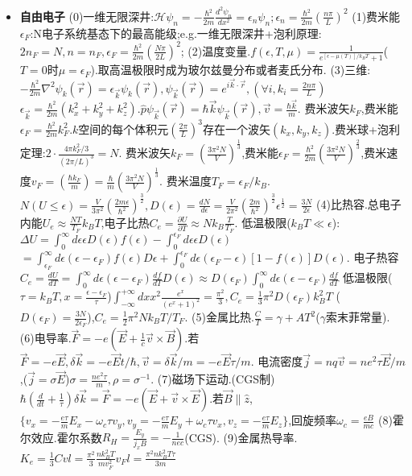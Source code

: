 \documentclass[UTF8,a4paper,3pt,twocolumn]{ctexart}
\begin{document}
\begin{itemize}
  \item \textbf{自由电子}
  (0)一维无限深井:$\mathcal{H}\psi_{n}=-\frac{\hbar^2}{2m}\frac{d^2\psi_{n}}{dx^2}=\epsilon_{n}\psi_{n};\epsilon_{n}=\frac{\hbar^2}{2m}(\frac{n\pi}{L})^2$
  (1)费米能$\epsilon_{F}$:N电子系统基态下的最高能级;e.g.一维无限深井+泡利原理:$2n_F=N,n=n_F,\epsilon_F=\frac{\hbar^2}{2m}(\frac{N\pi}{2L})^2$;
  (2)温度变量.$f(\epsilon,T,\mu)=\frac{1}{e^{[\epsilon-\mu(T)]/k_{B}T}+1}$($T=0$时$\mu=\epsilon_F$).取高温极限时成为玻尔兹曼分布或者麦氏分布.
  (3)三维:$-\frac{\hbar^2}{2m}\nabla^2\psi_{k}(\vec{r})=\epsilon_{\vec{k}}\psi_{k}(\vec{r}),\psi_{\vec{k}}(\vec{r})=e^{i\vec{k}\cdot\vec{r}},(\forall i,k_i=\frac{2n\pi}{L})$
  $\epsilon_{\vec{k}}=\frac{\hbar^2}{2m}(k_x^2+k_y^2+k_z^2)$.$\hat{p}\psi_{\vec{k}}(\vec{r})=\hbar\vec{k}\psi_{\vec{k}}(\vec{r}),\vec{v}=\frac{\hbar\vec{k}}{m}$.
  费米波矢$k_F$,费米能$\epsilon_F=\frac{\hbar^2}{2m}k_{F}^2$.$k$空间的每个体积元$(\frac{2\pi}{L})^3$存在一个波矢$(k_x,k_y,k_z)$.费米球+泡利定理:$2\cdot\frac{4\pi k_F^2/3}{(2\pi/L)^3}=N$.
  费米波矢$k_F=(\frac{3\pi^2N}{V})^{\frac{1}{3}}$,费米能$\epsilon_{F}=\frac{\hbar^2}{2m}(\frac{3\pi^2N}{V})^{\frac{2}{3}}$,费米速度$v_F=(\frac{\hbar k_F}{m})=\frac{\hbar}{m}(\frac{3\pi^2N}{V})^{\frac{1}{3}}$.
  费米温度$T_F=\epsilon_F/k_B$.$N(U\leq\epsilon)=\frac{V}{3\pi^2}(\frac{2m\epsilon}{\hbar^2})^{\frac{3}{2}},D(\epsilon)=\frac{dN}{d\epsilon}=\frac{V}{2\pi^2}(\frac{2m}{\hbar^2})^{\frac{3}{2}}\epsilon^{\frac{1}{2}}=\frac{3N}{2\epsilon}$
  (4)比热容.总电子内能$U_{e}\approx\frac{NT}{T_F}k_B T$,电子比热$C_{e}=\frac{\partial U}{\partial T}\approx Nk_B \frac{T}{T_F}$.
  低温极限($k_B T\ll \epsilon$):$\Delta U=\int_0^{\infty}d\epsilon\epsilon D(\epsilon)f(\epsilon)-\int_0^{\epsilon_F}d\epsilon\epsilon D(\epsilon)$
  $=\int_{\epsilon_F}^{\infty}d\epsilon(\epsilon-\epsilon_F)f(\epsilon)D\epsilon + \int_0^{\epsilon_F}d\epsilon(\epsilon_F-\epsilon)[1-f(\epsilon)]D(\epsilon)$.
  电子热容$C_e=\frac{dU}{dT}=\int_{0}^{\infty}d\epsilon(\epsilon-\epsilon_F)\frac{df}{dT}D(\epsilon)\approx D(\epsilon_F)\int_0^{\infty}d\epsilon(\epsilon-\epsilon_F)\frac{df}{dT}$
  低温极限($\tau=k_B T,x=\frac{\epsilon-\epsilon_F}{\tau}$)$\int_{-\infty}^{+\infty}dxx^2\frac{e^x}{(e^x +1)^2}=\frac{\pi^2}{3},C_e=\frac{1}{3}\pi^2D(\epsilon_F)k_B^2T$
  ($D(\epsilon_F)=\frac{3N}{2\epsilon_F}$),$C_e=\frac{1}{2}\pi^2Nk_BT/T_F$.
  (5)金属比热.$\frac{C}{T}=\gamma+AT^2$($\gamma$索末菲常量).
  (6)电导率.$\vec{F}=-e(\vec{E}+\frac{1}{c}\vec{v}\times\vec{B})$.若$\vec{F}=-e\vec{E},\delta\vec{k}=-e\vec{E}t/\hbar,\vec{v}=\delta\vec{k}/m=-e\vec{E}\tau/m$.
  电流密度$\vec{j}=nq\vec{v}=ne^2\tau\vec{E}/m$,($\vec{j}=\sigma\vec{E}$)$\sigma=\frac{ne^2\tau}{m},\rho=\sigma^{-1}$.
  (7)磁场下运动.(CGS制)$\hbar(\frac{d}{dt}+\frac{1}{\tau})\delta\vec{k}=\vec{F}=-e(\vec{E}+\vec{v}\times\vec{E})$.若$\vec{B}\parallel\hat{z}$,
  $\{v_x=-\frac{e\tau}{m}E_x-\omega_c\tau v_y,v_y=-\frac{e\tau}{m}E_y+\omega_c\tau v_x,v_z=-\frac{e\tau}{m}E_z\}$,回旋频率$\omega_c=\frac{eB}{mc}$
  (8)霍尔效应.霍尔系数$R_H=\frac{E_y}{j_x B}=-\frac{1}{nec}$(CGS).
  (9)金属热导率.$K_e=\frac{1}{3}Cvl=\frac{\pi^2}{3}\frac{nk_B^2T}{mv_F^2}v_Fl=\frac{\pi^2 n k_B^2 T\tau}{3m}$


\end{itemize}
\end{document}
